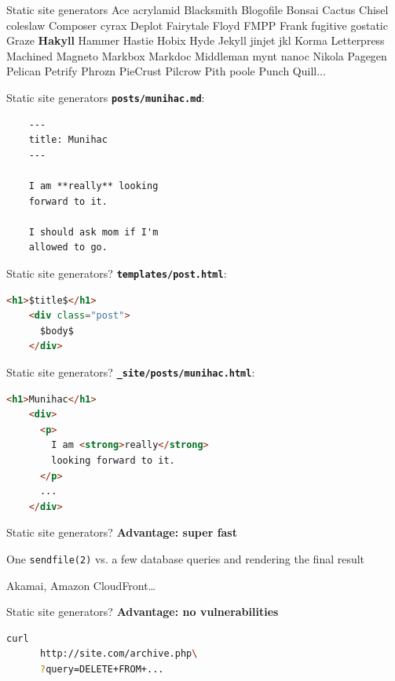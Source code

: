 \documentclass[20pt]{beamer}
\newcommand{\vspaced}{
    \vspace{5mm}
}
\begin{document}
\begin{frame}{Static site generators}
    \small{
    Ace acrylamid Blacksmith Blogofile Bonsai Cactus Chisel coleslaw
    Composer cyrax Deplot Fairytale Floyd FMPP Frank fugitive gostatic Graze
    \textbf{Hakyll} Hammer Hastie Hobix Hyde Jekyll jinjet jkl Korma Letterpress
    Machined Magneto Markbox Markdoc Middleman mynt nanoc Nikola Pagegen
    Pelican Petrify Phrozn PieCrust Pilcrow Pith poole Punch Quill...
    }
\end{frame}

\begin{frame}[fragile]{Static site generators}
    \textbf{\texttt{posts/munihac.md}}:
    \vspaced
    \begin{lstlisting}
    ---
    title: Munihac
    ---

    I am **really** looking
    forward to it.

    I should ask mom if I'm
    allowed to go.
    \end{lstlisting}
\end{frame}

\begin{frame}[fragile]{Static site generators?}
    \textbf{\texttt{templates/post.html}}:
    \vspaced
    \begin{lstlisting}[language=HTML]
    <h1>$title$</h1>
    <div class="post">
      $body$
    </div>
    \end{lstlisting}
\end{frame}

\begin{frame}[fragile]{Static site generators?}
    \textbf{\texttt{\_site/posts/munihac.html}}:
    \vspaced
    \begin{lstlisting}[language=HTML]
    <h1>Munihac</h1>
    <div>
      <p>
        I am <strong>really</strong>
        looking forward to it.
      </p>
      ...
    </div>
    \end{lstlisting}
\end{frame}

\begin{frame}{Static site generators?}
    \textbf{Advantage: super fast} \\
    \vspaced
    One \texttt{sendfile(2)} vs. a few database queries and rendering the final
    result \\
    \vspaced
    Akamai, Amazon CloudFront\ldots
\end{frame}

\begin{frame}[fragile]{Static site generators?}
    \textbf{Advantage: no vulnerabilities} \\
    \vspaced
    \begin{lstlisting}[language=bash]
    curl
      http://site.com/archive.php\
      ?query=DELETE+FROM+...
    \end{lstlisting}
\end{frame}
\end{document}
